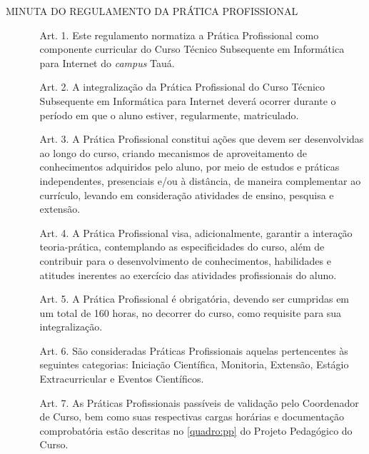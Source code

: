 \documentclass[
	12pt,				%
	openright,			%
	twoside,			%
	a4paper,			%
	chapter=TITLE,		%
	english,			%
	french,				%
	spanish,			%
	brazil,				%
	]{abntex2}
\begin{document}
\begin{anexos}
{\begin{center}
    \end{center}
}

\newpage

\begin{center}
	MINUTA DO REGULAMENTO DA PRÁTICA PROFISSIONAL
\end{center}


\begin{itemize}
	\item[] \small
	\begin{itemize}
	 
		\item [Art. 1\textordmasculine.] Este regulamento normatiza a Prática Profissional como componente curricular do Curso  Técnico Subsequente em Informática para Internet do \textit{campus} Tauá.
		
		\item [Art. 2\textordmasculine.] A integralização da Prática Profissional do Curso  Técnico Subsequente em Informática para Internet deverá ocorrer durante o período em que o aluno estiver, regularmente, matriculado.

		\item [Art. 3\textordmasculine.]  A Prática Profissional constitui ações que devem ser desenvolvidas ao longo do curso, criando mecanismos de aproveitamento de conhecimentos adquiridos pelo aluno, por meio de estudos e práticas independentes, presenciais e/ou à distância, de maneira complementar ao currículo, levando em consideração atividades de ensino, pesquisa e extensão.

		\item [Art. 4\textordmasculine.]  A Prática Profissional visa, adicionalmente, garantir a interação teoria-prática, contemplando as especificidades do curso, além de contribuir para o desenvolvimento de conhecimentos, habilidades e atitudes inerentes ao exercício das atividades profissionais do aluno.

		\item [Art. 5\textordmasculine.]  A Prática Profissional é obrigatória, devendo ser cumpridas em um total de 160 horas, no decorrer do curso, como requisite para sua integralização.

		\item [Art. 6\textordmasculine.]   São consideradas Práticas Profissionais aquelas pertencentes às seguintes categorias: Iniciação Científica, Monitoria, Extensão, Estágio Extracurricular e Eventos Científicos.

		\item [Art. 7\textordmasculine.]   As Práticas Profissionais passíveis de validação pelo Coordenador de Curso, bem como suas respectivas cargas horárias e documentação comprobatória estão descritas no \autoref{quadro:pp} do Projeto Pedagógico do Curso.
		

\end{itemize}
\end{itemize}
\end{anexos}
\end{document}
